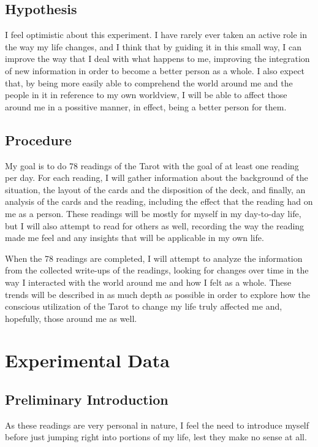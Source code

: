 \documentclass{article}
\begin{document}
\subsection{Hypothesis}
I feel optimistic about this experiment.  I have rarely ever taken an
active role in the way my life changes, and I think that by guiding it
in this small way, I can improve the way that I deal with what happens
to me, improving the integration of new information in order to become a
better person as a whole.  I also expect that, by being more easily able
to comprehend the world around me and the people in it in reference to
my own worldview, I will be able to affect those around me in a
possitive manner, in effect, being a better person for them.

\subsection{Procedure}
My goal is to do 78 readings of the Tarot with the goal of at least one
reading per day.  For each reading, I will gather information about the
background of the situation, the layout of the cards and the disposition
of the deck, and finally, an analysis of the cards and the reading,
including the effect that the reading had on me as a person.  These
readings will be mostly for myself in my day-to-day life, but I will
also attempt to read for others as well, recording the way the reading
made me feel and any insights that will be applicable in my own life.

When the 78 readings are completed, I will attempt to analyze the
information from the collected write-ups of the readings, looking for
changes over time in the way I interacted with the world around me and
how I felt as a whole.  These trends will be described in as much depth
as possible in order to explore how the conscious utilization of the
Tarot to change my life truly affected me and, hopefully, those around
me as well.

\section{Experimental Data}
\subsection*{Preliminary Introduction}
As these readings are very personal in nature, I feel the need to
introduce myself before just jumping right into portions of my life,
lest they make no sense at all.
\end{document}
